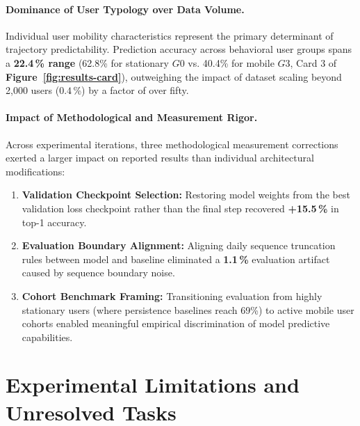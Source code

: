\paragraph{Dominance of User Typology over Data Volume.} Individual user mobility characteristics represent the primary determinant of trajectory predictability. Prediction accuracy across behavioral user groups spans a \textbf{22.4\,\% range} (62.8\% for stationary $G0$ vs. 40.4\% for mobile $G3$, Card 3 of \textbf{Figure~\ref{fig:results-card}}), outweighing the impact of dataset scaling beyond 2,000 users ($0.4$\,\%) by a factor of over fifty.

\paragraph{Impact of Methodological and Measurement Rigor.} Across experimental iterations, three methodological measurement corrections exerted a larger impact on reported results than individual architectural modifications:
\begin{enumerate}
    \item \textbf{Validation Checkpoint Selection:} Restoring model weights from the best validation loss checkpoint rather than the final step recovered \textbf{+15.5\,\%} in top-1 accuracy.
    \item \textbf{Evaluation Boundary Alignment:} Aligning daily sequence truncation rules between model and baseline eliminated a \textbf{1.1\,\%} evaluation artifact caused by sequence boundary noise.
    \item \textbf{Cohort Benchmark Framing:} Transitioning evaluation from highly stationary users (where persistence baselines reach 69\%) to active mobile user cohorts enabled meaningful empirical discrimination of model predictive capabilities.
\end{enumerate}

\section{Experimental Limitations and Unresolved Tasks}

